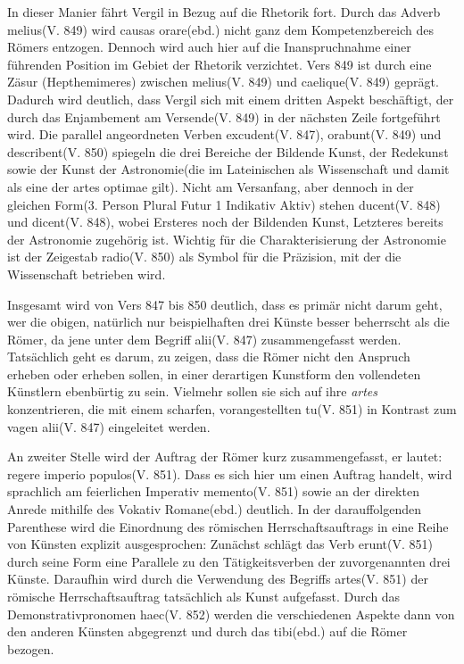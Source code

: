 \documentclass[12pt]{article}
\begin{document}
	In dieser Manier fährt Vergil in Bezug auf die Rhetorik fort. Durch das Adverb \glqq melius\grqq(V. 849) wird \glqq causas orare\grqq(ebd.) nicht ganz dem Kompetenzbereich des Römers entzogen. Dennoch wird auch hier auf die Inanspruchnahme einer führenden Position im Gebiet der Rhetorik verzichtet. Vers 849 ist durch eine Zäsur (Hepthemimeres) zwischen \glqq melius\grqq(V. 849) und \glqq caelique\grqq(V. 849) geprägt. Dadurch wird deutlich, dass Vergil sich mit einem dritten Aspekt beschäftigt, der durch das Enjambement am Versende(V. 849) in der nächsten Zeile fortgeführt wird. Die parallel angeordneten Verben \glqq excudent\grqq(V. 847), \glqq orabunt\grqq(V. 849) und \glqq describent\grqq(V. 850) spiegeln die drei Bereiche der Bildende Kunst, der Redekunst sowie der Kunst der Astronomie(die im Lateinischen als Wissenschaft und damit als eine der artes optimae gilt). Nicht am Versanfang, aber dennoch in der gleichen Form(3. Person Plural Futur 1 Indikativ Aktiv) stehen \glqq ducent\grqq(V. 848) und \glqq dicent\grqq(V. 848), wobei Ersteres noch der Bildenden Kunst, Letzteres bereits der Astronomie zugehörig ist. Wichtig für die Charakterisierung der Astronomie ist der Zeigestab \glqq radio\grqq(V. 850) als Symbol für die Präzision, mit der die Wissenschaft betrieben wird.
	
	Insgesamt wird von Vers 847 bis 850 deutlich, dass es primär nicht darum geht, wer die obigen, natürlich nur beispielhaften drei Künste besser beherrscht als die Römer, da jene unter dem Begriff \glqq alii\grqq(V. 847) zusammengefasst werden. Tatsächlich geht es darum, zu zeigen, dass die Römer nicht den Anspruch erheben oder erheben sollen, in einer derartigen Kunstform den vollendeten Künstlern ebenbürtig zu sein. Vielmehr sollen sie sich auf ihre \textit{artes} konzentrieren, die mit einem scharfen, vorangestellten \glqq tu\grqq(V. 851) in Kontrast zum vagen \glqq alii\grqq(V. 847) eingeleitet werden.
	
	An zweiter Stelle wird der Auftrag der Römer kurz zusammengefasst, er lautet: \glqq regere imperio populos\grqq(V. 851). Dass es sich hier um einen Auftrag handelt, wird sprachlich am feierlichen Imperativ \glqq memento\grqq(V. 851) sowie an der direkten Anrede mithilfe des Vokativ \glqq Romane\grqq(ebd.) deutlich.
	In der darauffolgenden Parenthese wird die Einordnung des römischen Herrschaftsauftrags in eine Reihe von Künsten explizit ausgesprochen: Zunächst schlägt das Verb \glqq erunt\grqq(V. 851) durch seine Form eine Parallele zu den Tätigkeitsverben der zuvorgenannten drei Künste. Daraufhin wird durch die Verwendung des Begriffs \glqq artes\grqq(V. 851) der römische Herrschaftsauftrag tatsächlich als Kunst aufgefasst.
	Durch das Demonstrativpronomen \glqq haec\grqq(V. 852)  werden die verschiedenen Aspekte dann von den anderen Künsten abgegrenzt und durch das \glqq tibi\grqq(ebd.) auf die Römer bezogen.
	
\end{document}
